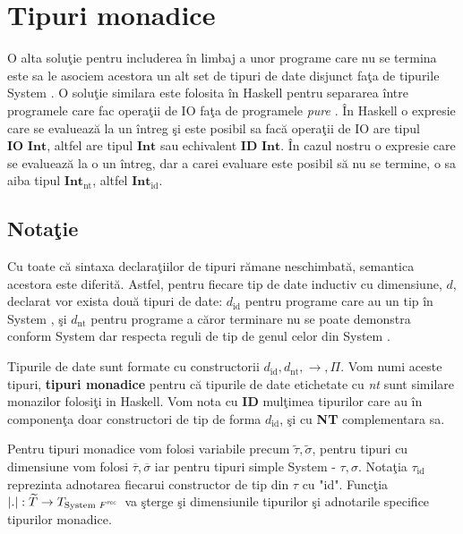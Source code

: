 \section{Tipuri monadice}\label{tip_monad}
\newcommand\id[1]{ {#1}_{\text{id}} }
\newcommand\nt[1]{ {#1}_{\text{nt}} }

O alta solu\c tie pentru includerea \^ in limbaj a unor programe care nu se termina este sa le asociem acestora un alt set de tipuri de date disjunct fa\c ta de tipurile System \fhat. O solu\c tie similara este folosita \^ in Haskell pentru separarea \^ intre programele care fac opera\c tii de IO fa\c ta de programele \emph{pure} \citep{158524}. \^ In Haskell o expresie care se evalueaz\u a la un \^ intreg \c si este posibil sa fac\u a opera\c tii de IO are tipul $\textbf{IO Int}$, altfel are tipul $\textbf{Int}$ sau echivalent $\textbf{ID Int}$. \^ In cazul nostru o expresie care se evalueaz\u a la o un \^ intreg, dar a carei evaluare este posibil s\u a nu se termine, o sa aiba tipul $\nt{\textbf{Int}}$, altfel $\id{\textbf{Int}}$.

\subsection{Nota\c tie}

Cu toate c\u a sintaxa declara\c tiilor de tipuri r\u amane neschimbat\u a, semantica acestora este diferit\u a. Astfel, pentru fiecare tip de date inductiv cu dimensiune, $d$, declarat vor exista dou\u a tipuri de date: $\id{d}$ pentru programe care au un tip \^ in System \fhat, \c si $\nt{d}$ pentru programe a c\u aror terminare nu se poate demonstra conform System \fhat dar respecta reguli de tip de genul celor din System \frec.

Tipurile de date sunt formate cu constructorii $\id{d},\nt{d},\to,\Pi$. Vom numi aceste tipuri, \textbf{tipuri monadice} pentru c\u a tipurile de date etichetate cu \emph{nt} sunt similare monazilor folosi\c ti in Haskell. Vom nota cu \textbf{ID} mul\c timea tipurilor care au \^ in componen\c ta doar constructori de tip de forma $\id{d}$, \c si cu \textbf{NT} complementara sa.

Pentru tipuri monadice vom folosi variabile precum $\widetilde{\tau}, \widetilde{\sigma}$, pentru tipuri cu dimensiune vom folosi $\overline{\tau}, \overline{\sigma}$ iar pentru tipuri simple System \frec - $\tau, \sigma$. Nota\c tia $\id{\tau}$ reprezinta adnotarea fiecarui constructor de tip din $\tau$ cu "id". Func\c tia $|.| : \widetilde{T} \to T_{\text{System $F^{\emph{rec}}\hspace{2pt}$}}$ va \c sterge \c si dimensiunile tipurilor \c si adnotarile specifice tipurilor monadice.
\done{}

